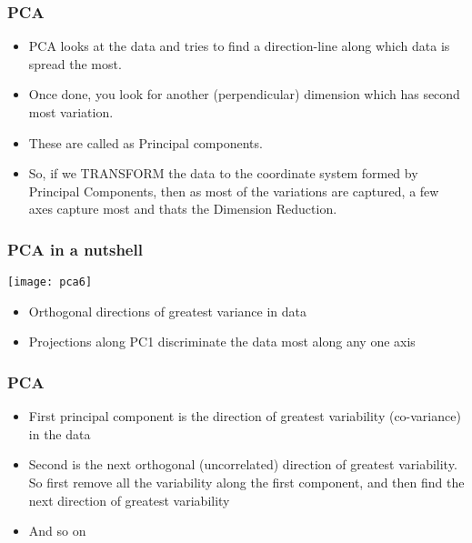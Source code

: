 \begin{frame}[fragile] \frametitle{PCA} 
\begin{itemize}
\item PCA looks at the data and tries to find a direction-line along which data is spread the most.
\item Once done, you look for another (perpendicular) dimension which has second most variation.
\item These are called as Principal components.
\item So, if we TRANSFORM the data to the coordinate system formed by Principal Components, then as most of the variations are captured, a few axes capture most and thats the Dimension Reduction.
\end{itemize}
\end{frame}
%

\begin{frame}[fragile] \frametitle{PCA in a nutshell} 
\begin{center}
\texttt{[image: pca6]}
\end{center}
\begin{itemize}
\item Orthogonal directions of greatest variance in data
\item Projections along PC1 discriminate the data most along any one axis
\end{itemize}
\end{frame}

\begin{frame}[fragile] \frametitle{PCA} 
\begin{itemize}
\item  First principal component is the direction of greatest
variability (co-variance) in the data
\item Second is the next orthogonal (uncorrelated) direction of greatest variability. So first remove all the variability along the first
component, and then find the next direction of greatest variability 
\item  And so on
\end{itemize}
\end{frame}

